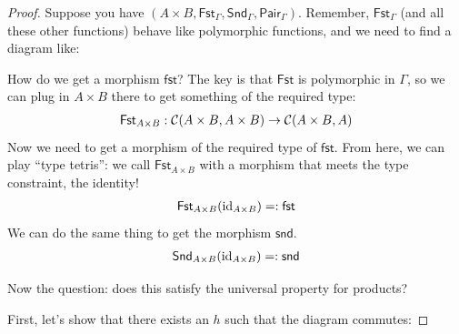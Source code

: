 \begin{proof}
  Suppose you have $(A \times B, \mathsf{Fst}_\Gamma, \mathsf{Snd}_\Gamma, 
  \mathsf{Pair}_\Gamma)$. Remember, $\mathsf{Fst}_\Gamma$ (and all these 
  other functions) behave like polymorphic functions, and we 
  need to find a diagram like:
  \begin{center}
  \end{center}

  How do we get a morphism $\mathsf{fst}$? The key is that $\mathsf{Fst}$ is
  polymorphic in $\Gamma$, so we can plug in $A \times B$ there 
  to get something of the required type:
  \begin{align*}
    \mathsf{Fst}_{A \times B} : \mathcal C(A \times B, A \times B) \to  \mathcal C(A \times B, A)
  \end{align*}
  Now we need to get a morphism of the required type of $\mathsf{fst}$.
  From here, we can play ``type tetris'': we call $\mathsf{Fst}_{A \times B}$
  with a morphism that meets the type constraint, the identity!
  \begin{align*}
    \mathsf{Fst}_{A \times B}(\operatorname{id}_{A \times B}) =: \mathsf{fst}
  \end{align*}
  We can do the same thing to get the morphism $\mathsf{snd}$.
  \begin{align*}
    \mathsf{Snd}_{A \times B}(\operatorname{id}_{A \times B}) =: \mathsf{snd}
  \end{align*}

  Now the question: does this satisfy the universal property 
  for products?

  First, let's show that there exists an $h$ such that the diagram
  commutes:


\end{proof}
